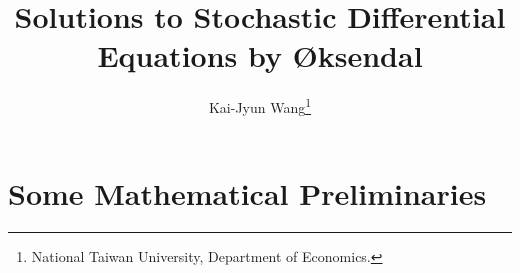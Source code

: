 \documentclass[a4paper, 12pt]{article}
\title{Solutions to Stochastic Differential Equations by \O ksendal}
\author{Kai-Jyun Wang\thanks{National Taiwan University, Department of Economics.}}
\date{}
\begin{document}
 
\maketitle


\tableofcontents
\newpage


\section{Some Mathematical Preliminaries}

\end{document}
